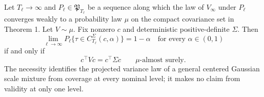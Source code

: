 Let \(T_\ell\to\infty\) and \(P_\ell\in\mathfrak P_{T_\ell}\) be a sequence along which the law of \(V_\infty\) under \(P_\ell\) converges weakly to a probability law \(\mu\) on the compact covariance set in Theorem 1. Let \(V\sim\mu\). Fix nonzero \(c\) and deterministic positive-definite \(\Sigma\). Then
\[
 \lim_{\ell\to\infty}P_\ell\{\tau\in C_{T_\ell}^{\Sigma}(c,\alpha)\}=1-\alpha
 \quad\text{for every }\alpha\in(0,1)
\]
if and only if
\[
 c^\top Vc=c^\top\Sigma c\qquad\mu\text{-almost surely}.
\]
The necessity identifies the projected variance law of a general centered Gaussian scale mixture from coverage at every nominal level; it makes no claim from validity at only one level.